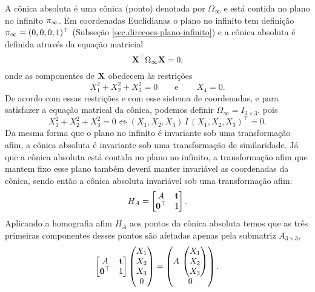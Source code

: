 A cônica absoluta é uma cônica (ponto) denotada por $\Omega_\infty$ e está contida no plano no infinito $\pi_\infty$. Em coordenadas Euclidianas o plano no infinito tem definição $\pi_\infty=(0,0,0,1)^\top$ (Subseção \ref{sec.direcoes-plano-infinito}) e a cônica absoluta é definida através da equação matricial
\begin{equation*}
\mathbf{X}^\top\Omega_\infty\mathbf{X}=0,
\end{equation*} 
onde as componentes de $\mathbf{X}$ obedecem às restrições
\begin{equation*}
X_1^2+X_2^2+X_3^2=0\qquad\text{e}\qquad\,X_4=0.
\end{equation*}
De acordo com essas restrições e com esse sistema de coordenadas, e para satisfazer a equação matrical da cônica, podemos definir $\Omega_\infty=I_{3\times3}$, pois
\begin{equation*}
X_1^2+X_2^2+X_3^2=0\Leftrightarrow(X_1,X_2,X_3)\,I\,(X_1,X_2,X_3)^\top=0.
\end{equation*}
Da mesma forma que o plano no infinito é invariante sob uma transformação afim, a cônica absoluta é invariante sob uma transformação de similaridade. Já que a cônica absoluta está contida no plano no infinito, a transformação afim que mantem fixo esse plano também deverá manter invariável as coordenadas da cônica, sendo então a cônica absoluta invariável sob uma transformação afim:
\begin{equation*}
H_A=
\begin{bmatrix}
A&{\bf t}\\
{\bf 0}^\top&1
\end{bmatrix}.
\end{equation*}
Aplicando a homografia afim $H_A$ aos pontos da cônica absoluta temos que as três primeiras componentes desses pontos são afetadas apenas pela submatriz $A_{3\times3}$,
\begin{equation*}
\begin{bmatrix}
A&{\bf t}\\
{\bf 0}^\top&1
\end{bmatrix}
\begin{pmatrix}
X_1\\
X_2\\
X_3\\
0
\end{pmatrix}
=
\begin{pmatrix}
A\,
\begin{pmatrix}
X_1\\
X_2\\
X_3
\end{pmatrix}\\
0
\end{pmatrix}.
\end{equation*}
